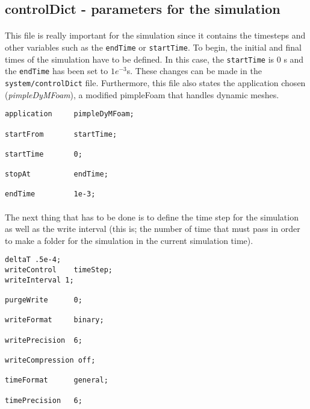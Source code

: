 \subsection{controlDict - parameters for the simulation}

\paragraph{}This file is really important for the simulation since it contains the timesteps and other variables such as the \texttt{endTime} or \texttt{startTime}. To begin, the initial and final times of the simulation have to be defined. In this case, the \texttt{startTime} is 0 s and the \texttt{endTime} has been set to $1e^{-3}$s. These changes can be made in the \texttt{system/controlDict} file. Furthermore, this file also states the application chosen (\textit{pimpleDyMFoam}), a modified pimpleFoam that handles dynamic meshes.

\begin{footnotesize}
\begin{verbatim}
application     pimpleDyMFoam;

startFrom       startTime;

startTime       0;

stopAt          endTime;

endTime         1e-3;
\end{verbatim}
\end{footnotesize}

\paragraph{}The next thing that has to be done is to define the time step for the simulation as well as the write interval (this is; the number of time that must pass in order to make a folder for the simulation in the current simulation time). 

\begin{footnotesize}
\begin{verbatim}
deltaT .5e-4;
writeControl    timeStep;
writeInterval 1;

purgeWrite      0;

writeFormat     binary;

writePrecision  6;

writeCompression off;

timeFormat      general;

timePrecision   6;
\end{verbatim}
\end{footnotesize}

